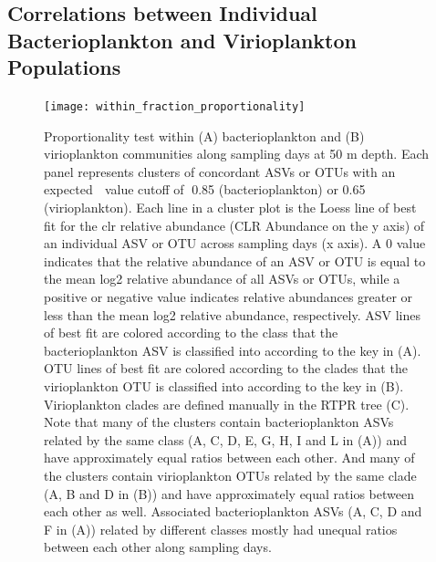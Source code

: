 \documentclass[a4,center,fleqn]{NAR}
\begin{document}
\subsection{Correlations between Individual Bacterioplankton and Virioplankton Populations}

\begin{figure}[t]
\begin{center}
\texttt{[image: within\_fraction\_proportionality]}
\end{center}
\caption{
Proportionality test within (A) bacterioplankton and (B) virioplankton communities along sampling days at 50 m depth. Each panel represents clusters of concordant ASVs or OTUs with an expected 􏰄 value cutoff of 􏰀0.85 (bacterioplankton) or 0.65 (virioplankton). Each line in a cluster plot is the Loess line of best fit for the clr relative abundance (CLR Abundance on the y axis) of an individual ASV or OTU across sampling days (x axis). A 0 value indicates that the relative abundance of an ASV or OTU is equal to the mean log2 relative abundance of all ASVs or OTUs, while a positive or negative value indicates relative abundances greater or less than the mean log2 relative abundance, respectively. ASV lines of best fit are colored according to the class that the bacterioplankton ASV is classified into according to the key in (A). OTU lines of best fit are colored according to the clades that the virioplankton OTU is classified into according to the key in (B). Virioplankton clades are defined manually in the RTPR tree (C). Note that many of the clusters contain bacterioplankton ASVs related by the same class (A, C, D, E, G, H, I and L in (A)) and have approximately equal ratios between each other. And many of the clusters contain virioplankton OTUs related by the same clade (A, B and D in (B)) and have approximately equal ratios between each other as well. Associated bacterioplankton ASVs (A, C, D and F in (A)) related by different classes mostly had unequal ratios between each other along sampling days. 
}
\label{within_fraction_proportionality} 
\end{figure}
\end{document}
